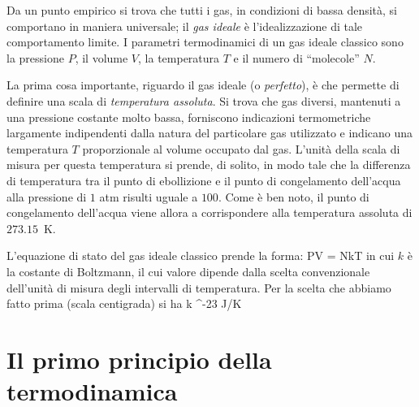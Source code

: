 Da un punto empirico si trova che tutti i gas, in condizioni di bassa densità, si comportano in maniera universale; il {\em gas ideale} è l'idealizzazione di tale comportamento limite. I parametri termodinamici di un gas  ideale classico sono la pressione $P$, il volume $V$, la temperatura $T$ e il numero di ``molecole'' $N$.

La prima cosa importante, riguardo il gas ideale (o {\em perfetto}), è che permette di definire una scala di {\em temperatura assoluta}. Si trova che gas diversi, mantenuti a una pressione costante molto bassa, forniscono indicazioni termometriche largamente indipendenti dalla natura del particolare gas utilizzato e indicano una temperatura $T$ proporzionale al volume occupato dal gas. L'unità della scala di misura per questa temperatura si prende, di solito, in modo tale che la differenza di temperatura tra il punto di ebollizione e il punto di congelamento dell'acqua alla pressione di $1$ atm risulti uguale a $100$. Come è ben noto, il punto di congelamento dell'acqua viene allora a corrispondere alla temperatura assoluta di $273.15$~K.

L'equazione di stato del gas ideale classico prende la forma:
\be
\label{eq:01-pvnkt}
PV = NkT
\ee
in cui $k$ è la costante di Boltzmann, il cui valore dipende dalla scelta convenzionale dell'unità di misura degli intervalli di temperatura. Per la scelta che abbiamo fatto prima (scala centigrada) si ha
\be
\label{eq:01-valk}
k  ^{-23} \textrm{J/K}
\ee

\section{Il primo principio della termodinamica}
\label{sec:01-primo}

